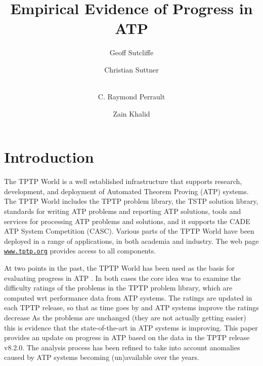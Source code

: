 \documentclass[runningheads]{llncs}
\begin{document}
\title{Empirical Evidence of Progress in ATP}

\author{
Geoff Sutcliffe
\and
Christian Suttner
\and \\
C. Raymond Perrault
\and
Zain Khalid
}

\maketitle
\begin{abstract}

\end{abstract}
\section{Introduction}
\label{Introduction}

The TPTP World \cite{Sut17} is a well established infrastructure that supports research, 
development, and deployment of Automated Theorem Proving (ATP) systems.
The TPTP World includes the TPTP problem library,
the TSTP solution library,
standards for writing ATP problems and reporting ATP solutions,
tools and services for processing ATP problems and solutions,
and it supports the CADE ATP System Competition (CASC).
Various parts of the TPTP World have been deployed in a range of applications,
in both academia and industry.
The web page \href{https://www.tptp.org}{\tt www.tptp.org} provides access to all 
components.

At two points in the past, the TPTP World has been used as the basis for evaluating progress
in ATP \cite{SFS01,SSP21}.
In both cases the core idea was to examine the difficulty ratings of the problems in the TPTP 
problem library, which are computed wrt performance data from ATP systems.
The ratings are updated in each TPTP release, so that as time goes by and ATP systems improve 
the ratings decrease
As the problems are unchanged (they are not actually getting easier) this is evidence that 
the state-of-the-art in ATP systems is improving.
This paper provides an update on progress in ATP based on the data in the TPTP release v8.2.0.
The analysis process has been refined to take into account anomalies caused by ATP systems
becoming (un)available over the years.
\end{document}
